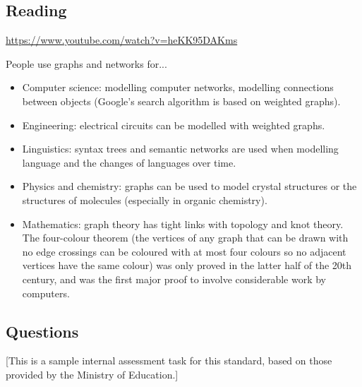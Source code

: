 



\subsection*{Reading}
\begin{center}
\begin{tcolorbox}[width=0.8\textwidth,colback={white},title={\textbf{Go and watch...}},colbacktitle=black,coltitle=white]
  \textcolor{black}{\url{https://www.youtube.com/watch?v=heKK95DAKms}}
\end{tcolorbox}
\end{center}

\begin{center}
\begin{tcolorbox}[width=0.8\textwidth,colback={white},title={\textbf{What's it good for?}},colbacktitle=MidnightBlue,coltitle=white]
  People use graphs and networks for...
  \begin{itemize}
    \item Computer science: modelling computer networks, modelling connections between objects (Google's search algorithm is based on weighted graphs).
    \item Engineering: electrical circuits can be modelled with weighted graphs.
    \item Linguistics: syntax trees and semantic networks are used when modelling language and the changes of languages over time.
    \item Physics and chemistry: graphs can be used to model crystal structures or the structures of molecules (especially in organic chemistry).
    \item Mathematics: graph theory has tight links with topology and knot theory. The four-colour theorem (the vertices of any graph that can be
          drawn with no edge crossings can be coloured with at most four colours so no adjacent vertices have the same colour) was only proved in
          the latter half of the 20th century, and was the first major proof to involve considerable work by computers.
  \end{itemize}
\end{tcolorbox}
\end{center}

\clearpage
\subsection*{Questions}
[This is a sample internal assessment task for this standard, based on those provided by the Ministry of Education.]

